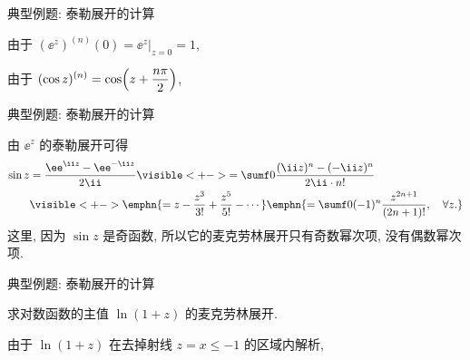 \begin{frame}{典型例题: 泰勒展开的计算}
	\onslide<+->
	\begin{example}
		由于 $(\ee^z)^{(n)}(0)=\ee^z|_{z=0}=1$,
		\bigdel
	\end{example}

	\onslide<+->
	\begin{example}
		由于 $\displaystyle(\cos z)^{(n)}=\cos\Bigl(z+\dfrac{n\pi}2\Bigr)$,
		\onslide<+->{%
			\[
				(\cos z)^{(2n+1)}(0)=0,\quad (\cos z)^{(2n)}(0)=(-1)^n,
			\]
		}\bigdel
	\end{example}
\end{frame}


\begin{frame}{典型例题: 泰勒展开的计算}
	\onslide<+->
	\begin{example}
		由 $\ee^z$ 的泰勒展开可得
		\begin{align*}
			\sin z&=\frac{\ee^{\ii z}-\ee^{-\ii z}}{2\ii}
			\visible<+->{=\sumf0\frac{(\ii z)^n-(-\ii z)^n}{2\ii\cdot n!}}\\
			&\visible<+->{\emphn{=z-\frac{z^3}{3!}+\frac{z^5}{5!}-\cdots}
			\emphn{=\sumf0(-1)^n\frac{z^{2n+1}}{(2n+1)!},\quad\forall z.}}
		\end{align*}
		\onslide<+->
		这里, 因为 $\sin z$ 是奇函数, 所以它的麦克劳林展开只有奇数幂次项, 没有偶数幂次项.
	\end{example}
\end{frame}


\begin{frame}{典型例题: 泰勒展开的计算}
	\onslide<+->
	\begin{example}[nearnext]
		求对数函数的主值 $\ln(1+z)$ 的麦克劳林展开.
	\end{example}
	\onslide<+->
	\begin{solution}[nearprev]
		由于 $\ln(1+z)$ 在去掉射线 $z=x\le-1$ 的区域内解析,
		\bigdel
	\end{solution}
\end{frame}


